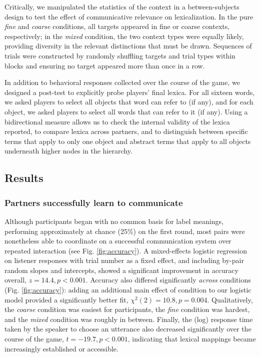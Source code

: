 \documentclass[10pt,letterpaper]{article}
\begin{document}
Critically, we manipulated the statistics of the context in a between-subjects design to test the effect of communicative relevance on lexicalization. In the pure \emph{fine} and \emph{coarse} conditions, all targets appeared in fine or coarse contexts, respectively; in the \emph{mixed} condition, the two context types were equally likely, providing diversity in the relevant distinctions that must be drawn. Sequences of trials were constructed by randomly shuffling targets and trial types within blocks and ensuring no target appeared more than once in a row. 

In addition to behavioral responses collected over the course of the game, we designed a post-test to explicitly probe players' final lexica. For all sixteen words, we asked players to select all objects that word can refer to (if any), and for each object, we asked players to select all words that can refer to it (if any). Using a bidirectional measure allows us to check the internal validity of the lexica reported, to compare lexica across partners, and to distinguish between specific terms that apply to only one object and abstract terms that apply to all objects underneath higher nodes in the hierarchy. 

\subsection{Results}

\subsubsection{Partners successfully learn to communicate}

Although participants began with no common basis for label meanings, performing approximately at chance (25\%) on the first round, most pairs were nonetheless able to coordinate on a successful communication system over repeated interaction (see Fig. \ref{fig:accuracy}). 
A mixed-effects logistic regression on listener responses with trial number as a fixed effect, and including by-pair random slopes and intercepts, showed a significant improvement in accuracy overall, $z = 14.4, p < 0.001$. 
Accuracy also differed significantly \emph{across} conditions (Fig. \ref{fig:accuracy}): adding an additional main effect of condition to our logistic model provided a significantly better fit, $\chi^2(2) = 10.8, p = 0.004$. 
Qualitatively, the \emph{coarse} condition was easiest for participants, the \emph{fine} condition was hardest, and the \emph{mixed} condition was roughly in between. %
Finally, the (log) response time taken by the speaker to choose an utterance also decreased significantly over the course of the game, $t = -19.7, p < 0.001$, indicating that lexical mappings became increasingly established or accessible.
\end{document}
